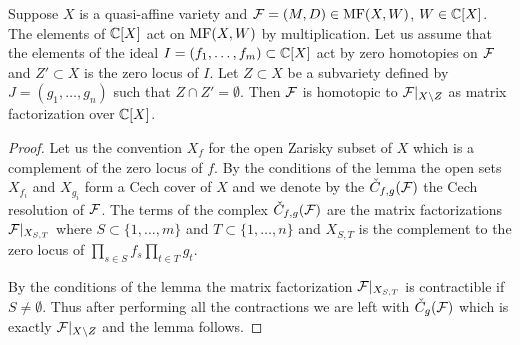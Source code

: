  \begin{lemma} Suppose $X$ is a quasi-affine variety and $\mathcal{F}=(M,D)\in \mathrm{MF}(X,W)$, $W\in \mathbb{C}[X]$. The elements of \(\mathbb{C}[X]\) act on
   \(\mathrm{MF}(X,W)\) by multiplication. Let us assume that
   the elements of the ideal $I=(f_1,\dots,f_m)\subset \mathbb{C}[X]$ act by zero homotopies on $\mathcal{F}$ and $Z'\subset X$ is the
   zero locus of $I$. Let $Z\subset X$ be a subvariety
   defined by $J=(g_1,\dots,g_n)$ such that $Z\cap Z'=\emptyset$. Then $\mathcal{F}$ is homotopic to $\mathcal{F}|_{X\setminus Z}$ as
   matrix factorization over $\mathbb{C}[X]$.
\end{lemma}
\begin{proof}
  Let us the convention $X_f$ for the open Zarisky subset of $X$ which is a complement of the zero locus of $f$.
  By the conditions of the lemma the open sets $X_{f_i}$ and $X_{g_i}$ form a Cech cover of $X$ and we denote by the
  $\check{C}_{f,g}(\mathcal{F})$ the Cech resolution of $\mathcal{F}$. The terms of the complex $\check{C}_{f,g}(\mathcal{F})$ are the matrix factorizations
  $\mathcal{F}|_{X_{S,T}}$ where $S\subset \{ 1,\dots, m\}$ and $T\subset \{ 1,\dots, n\}$  and $X_{S,T}$ is the complement to the zero locus
    of $\prod_{s\in S}f_s\prod_{t\in T} g_t$.

    By the conditions of the lemma the matrix factorization $\mathcal{F}|_{X_{S,T}}$ is contractible if $S\ne \emptyset$. Thus after performing all the
    contractions we  are left with $\check{C}_{g}(\mathcal{F})$ which is exactly $\mathcal{F}|_{X\setminus Z}$ and the lemma follows.
\end{proof}







